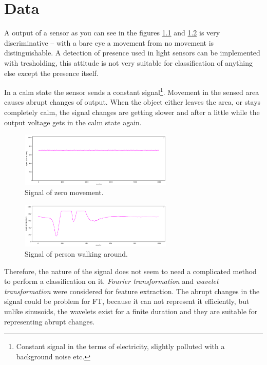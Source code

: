 \chapter{Data}

A output of a sensor as you can see in the figures \ref{fig:signalcalm} and \ref{fig:signalwalk}
is very discriminative -- with a bare eye a movement from no movement is distinguishable.
A detection of presence used in light sensors can be implemented with tresholding, this attitude is
not very suitable for classification of anything else except the presence itself.

In a calm state the sensor sends a constant signal\footnote{Constant signal in the terms
of electricity, slightly polluted with a background noise etc.}. Movement in the sensed area causes
abrupt changes of output. When the object either leaves the area, or stays completely calm, the signal
changes are getting slower and after a little while the output voltage gets in the calm state again.

\begin{figure}[h!]
\begin{center}
\includegraphics[width=0.65\textwidth]{render/signal_calm.png}
\caption{Signal of zero movement.\label{fig:signalcalm}}
\end{center}
\end{figure}

\begin{figure}[h!]
\begin{center}
\includegraphics[width=0.65\textwidth]{render/signal_walk.png}
\caption{Signal of person walking around.\label{fig:signalwalk}}
\end{center}
\end{figure}

Therefore, the nature of the signal does not seem to need a complicated method to perform a classification on it.
{\it Fourier transformation} and {\it wavelet transformation} were considered for feature
extraction. The abrupt changes in the signal could be problem for FT, because it can not represent
it efficiently\cite{SinglePIR}, %
but unlike sinusoids, the wavelets exist for a finite duration and they are suitable for representing
abrupt changes.

